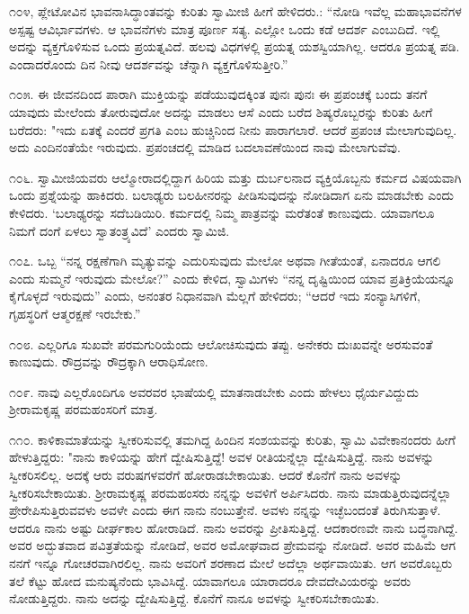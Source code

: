೧೦೪, ಪ್ಲೇಟೋವಿನ ಭಾವನಾಸಿದ್ಧಾಂತವನ್ನು  ಕುರಿತು ಸ್ವಾಮೀಜಿ ಹೀಗೆ ಹೇಳಿದರು.: “ನೋಡಿ ಇವೆಲ್ಲ ಮಹಾಭಾವನೆಗಳ ಅಸ್ಪಷ್ಟ ಆವಿರ್ಭಾವಗಳು. ಆ ಭಾವನೆಗಳು ಮಾತ್ರ ಪೂರ್ಣ ಸತ್ಯ. ಎಲ್ಲೋ ಒಂದು ಕಡೆ ಆದರ್ಶ ಎಂಬುದಿದೆ. ಇಲ್ಲಿ ಅದನ್ನು ವ್ಯಕ್ತಗೊಳಿಸುವ ಒಂದು ಪ್ರಯತ್ನವಿದೆ. ಹಲವು ವಿಧಗಳಲ್ಲಿ ಪ್ರಯತ್ನ ಯಶಸ್ವಿಯಾಗಿಲ್ಲ. ಆದರೂ ಪ್ರಯತ್ನ ಪಡಿ. ಎಂದಾದರೊಂದು ದಿನ ನೀವು ಆದರ್ಶವನ್ನು ಚೆನ್ನಾಗಿ ವ್ಯಕ್ತಗೊಳಿಸುತ್ತೀರಿ.”

೧೦೫. ಈ ಜೀವನದಿಂದ ಪಾರಾಗಿ ಮುಕ್ತಿಯನ್ನು ಪಡೆಯುವುದಕ್ಕಿಂತ ಪುನಃ ಪುನಃ ಈ ಪ್ರಪಂಚಕ್ಕೆ ಬಂದು ತನಗೆ ಯಾವುದು ಮೇಲೆಂದು ತೋರುವುದೋ ಅದನ್ನು ಮಾಡಲು ಆಸೆ ಎಂದು ಬರೆದ ಶಿಷ್ಯರೊಬ್ಬರನ್ನು ಕುರಿತು ಹೀಗೆ ಬರೆದರು: "ಇದು ಏತಕ್ಕೆ ಎಂದರೆ ಪ್ರಗತಿ ಎಂಬ ಹುಚ್ಚಿನಿಂದ ನೀನು ಪಾರಾಗಲಾರೆ. ಆದರೆ ಪ್ರಪಂಚ ಮೇಲಾಗುವುದಿಲ್ಲ. ಅದು ಎಂದಿನಂತೆಯೇ ಇರುವುದು. ಪ್ರಪಂಚದಲ್ಲಿ ಮಾಡಿದ ಬದಲಾವಣೆಯಿಂದ ನಾವು ಮೇಲಾಗುವೆವು.

೧೦೬. ಸ್ವಾಮೀಜಿಯವರು ಆಲ್ಮೋರಾದಲ್ಲಿದ್ದಾಗ ಹಿರಿಯ ಮತ್ತು ದುರ್ಬಲನಾದ ವ್ಯಕ್ತಿಯೊಬ್ಬನು ಕರ್ಮದ ವಿಷಯವಾಗಿ ಒಂದು ಪ್ರಶ್ನೆಯನ್ನು ಹಾಕಿದರು. ಬಲಾಢ್ಯರು ಬಲಹೀನರನ್ನು ಪೀಡಿಸುವುದನ್ನು ನೋಡಿದಾಗ ಏನು ಮಾಡಬೇಕು ಎಂದು ಕೇಳಿದರು. ‘ಬಲಾಢ್ಯರನ್ನು ಸದೆಬಡಿಯಿರಿ. ಕರ್ಮದಲ್ಲಿ ನಿಮ್ಮ ಪಾತ್ರವನ್ನು ಮರೆತಂತೆ ಕಾಣುವುದು. ಯಾವಾಗಲೂ ನಿಮಗೆ ದಂಗೆ ಏಳಲು ಸ್ವಾತಂತ್ರ್ಯವಿದೆ’ ಎಂದರು ಸ್ವಾಮಿಜಿ.

೧೦೭. ಒಬ್ಬ “ನನ್ನ ರಕ್ಷಣೆಗಾಗಿ ಮೃತ್ಯುವನ್ನು ಎದುರಿಸುವುದು ಮೇಲೋ ಅಥವಾ ಗೀತೆಯಂತೆ, ಏನಾದರೂ ಆಗಲಿ ಎಂದು ಸುಮ್ಮನೆ ಇರುವುದು ಮೇಲೋ?” ಎಂದು ಕೇಳಿದ, ಸ್ವಾಮಿಗಳು “ನನ್ನ ದೃಷ್ಟಿಯಿಂದ ಯಾವ ಪ್ರತಿಕ್ರಿಯೆಯನ್ನೂ ಕೈಗೊಳ್ಳದೆ ಇರುವುದು” ಎಂದು, ಅನಂತರ ನಿಧಾನವಾಗಿ ಮೆಲ್ಲಗೆ ಹೇಳಿದರು; “ಆದರೆ ಇದು ಸಂನ್ಯಾಸಿಗಳಿಗೆ, ಗೃಹಸ್ಥರಿಗೆ ಆತ್ಮರಕ್ಷಣೆ ಇರಬೇಕು.”

೧೦೮. ಎಲ್ಲರಿಗೂ ಸುಖವೇ ಪರಮಗುರಿಯೆಂದು ಆಲೋಚಿಸುವುದು ತಪ್ಪು. ಅನೇಕರು ದುಃಖವನ್ನೇ ಅರಸುವಂತೆ ಕಾಣುವುದು. ರೌದ್ರವನ್ನು ರೌದ್ರಕ್ಕಾಗಿ ಆರಾಧಿಸೋಣ.

೧೦೯. ನಾವು ಎಲ್ಲರೊಂದಿಗೂ ಅವರವರ ಭಾಷೆಯಲ್ಲಿ ಮಾತನಾಡಬೇಕು ಎಂದು ಹೇಳಲು ಧೈರ್ಯವಿದ್ದುದು ಶ‍್ರೀರಾಮಕೃಷ್ಣ ಪರಮಹಂಸರಿಗೆ ಮಾತ್ರ.

೧೧೦. ಕಾಳಿಕಾಮಾತೆಯನ್ನು ಸ್ವೀಕರಿಸುವಲ್ಲಿ ತಮಗಿದ್ದ ಹಿಂದಿನ ಸಂಶಯವನ್ನು ಕುರಿತು, ಸ್ವಾಮಿ ವಿವೇಕಾನಂದರು ಹೀಗೆ ಹೇಳುತ್ತಿದ್ದರು: "ನಾನು ಕಾಳಿಯನ್ನು ಹೇಗೆ ದ್ವೇಷಿಸುತ್ತಿದ್ದೆ! ಅವಳ ರೀತಿಯನ್ನೆಲ್ಲಾ ದ್ವೇಷಿಸುತ್ತಿದ್ದೆ. ನಾನು ಅವಳನ್ನು ಸ್ವೀಕರಿಸಲಿಲ್ಲ. ಅದಕ್ಕೆ ಆರು ವರುಷಗಳವರೆಗೆ ಹೋರಾಡಬೇಕಾಯಿತು. ಆದರೆ ಕೊನೆಗೆ ನಾನು ಅವಳನ್ನು ಸ್ವೀಕರಿಸಬೇಕಾಯಿತು. ಶ‍್ರೀರಾಮಕೃಷ್ಣ ಪರಮಹಂಸರು ನನ್ನನ್ನು ಅವಳಿಗೆ ಅರ್ಪಿಸಿದರು. ನಾನು ಮಾಡುತ್ತಿರುವುದನ್ನೆಲ್ಲಾ ಪ್ರೇರೇಪಿಸುತ್ತಿರುವವಳು ಅವಳೇ ಎಂದು ಈಗ ನಾನು ನಂಬುತ್ತೇನೆ. ಅವಳು ನನ್ನನ್ನು ಇಚ್ಛೆಬಂದಂತೆ ತಿರುಗಿಸುತ್ತಾಳೆ. ಆದರೂ ನಾನು ಅಷ್ಟು ದೀರ್ಘಕಾಲ ಹೋರಾಡಿದೆ. ನಾನು ಅವರನ್ನು ಪ್ರೀತಿಸುತ್ತಿದ್ದೆ. ಆದಕಾರಣವೇ ನಾನು ಬದ್ಧನಾಗಿದ್ದೆ. ಅವರ ಅದ್ಭುತವಾದ ಪವಿತ್ರತೆಯನ್ನು ನೋಡಿದೆ, ಅವರ ಅಮೋಘವಾದ ಪ್ರೇಮವನ್ನು ನೋಡಿದೆ. ಅವರ ಮಹಿಮೆ ಆಗ ನನಗೆ ಇನ್ನೂ ಗೋಚರವಾಗಿರಲಿಲ್ಲ. ನಾನು ಅವರಿಗೆ ಶರಣಾದ ಮೇಲೆ ಅದೆಲ್ಲಾ ಅರ್ಥವಾಯಿತು. ಆಗ ಅವರೊಬ್ಬರು ತಲೆ ಕೆಟ್ಟು ಹೋದ ಮನುಷ್ಯನೆಂದು ಭಾವಿಸಿದ್ದೆ. ಯಾವಾಗಲೂ ಯಾರಾದರೂ ದೇವದೇವಿಯರನ್ನು ಅವರು ನೋಡುತ್ತಿದ್ದರು. ನಾನು ಅದನ್ನು ದ್ವೇಷಿಸುತ್ತಿದ್ದೆ. ಕೊನೆಗೆ ನಾನೂ ಅವಳನ್ನು ಸ್ವೀಕರಿಸಬೇಕಾಯಿತು.

